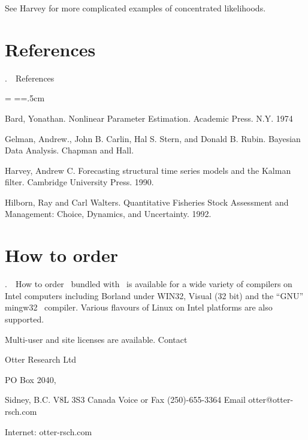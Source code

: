 \documentclass[12pt]{book}
\makeatletter
\def\mysection#1{\section{#1}{\bigbf \medbreak\noindent\number\c@chapter.\number\c@section\ \ #1\medbreak}}
\makeatother
\begin{document}
See Harvey for more complicated examples of concentrated likelihoods.
\mysection{References}
\htmlbeginignore
\medskip
{
\rmsmall\parindent=0cm \parskip=\medskipamount
\everypar={\hangindent=.5cm }
\htmlendignore

Bard, Yonathan. Nonlinear Parameter Estimation. 
Academic Press. N.Y. 1974

Gelman, Andrew., John B. Carlin, Hal S. Stern, and Donald B. Rubin.
Bayesian Data Analysis. Chapman and Hall. 

Harvey, Andrew C. Forecasting structural time series models and
the Kalman filter. Cambridge University Press. 1990.

Hilborn, Ray and Carl Walters. Quantitative Fisheries Stock
Assessment and Management: Choice, Dynamics, and Uncertainty.
1992.

\par
}

\mysection{How to order \ADM}
\ADM\ bundled with \AD\ is available for a wide variety of compilers on
Intel computers including Borland \cplus under WIN32, 
Visual \cplus (32 bit) and the ``GNU'' mingw32 \cplus\ compiler.  
Various flavours of Linux on Intel platforms are also supported.

Multi-user and site licenses
are available.
Contact 
\htmlbeginignore
\medskip
{\openup -4pt\obeylines
\htmlendignore
Otter Research Ltd

PO Box 2040, 

Sidney, B.C. V8L 3S3
Canada 
Voice or Fax (250)-655-3364
Email otter@otter-rsch.com

Internet: otter-rsch.com
\htmlbeginignore
}
\htmlendignore
\endchapter
%
\htmlnewfile
{
\pagestyle{xxx}

\def\hrefname#1#2{{
  \setbox0\hbox{#2 }
\myht=\ht0
\myhtt=\ht0
\mydp=\dp0
\mydpp=\dp0
\mywidth=\wd0
\advance \myht by 4pt
\advance \myhtt by 3pt
\advance \mydp by 4pt
\advance \mydpp by 3pt
\advance \mywidth by 2pt
\hbox{\vrule height\myht depth\mydp width 0pt
\pdfstartlink height \myhtt depth \mydpp attr {/C [0.9 0 0.0] /Border [0 0 1] } goto name {page.#1}
 \ #2

\pdfendlink}}}

\htmlnewfile
\twocolumn
{}


\onecolumn
\vfill
}
\end{document}
